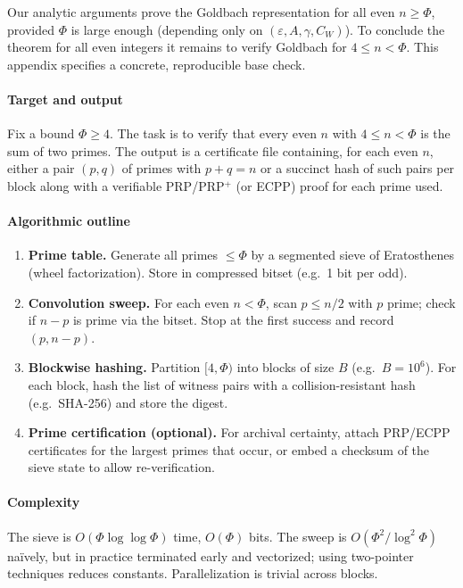 Our analytic arguments prove the Goldbach representation for all even $n\ge \Phi$, provided $\Phi$ is large enough (depending only on $(\varepsilon,A,\gamma,C_W)$). To conclude the theorem for all even integers it remains to verify Goldbach for $4\le n<\Phi$. This appendix specifies a concrete, reproducible base check.

\paragraph{Target and output}
Fix a bound $\Phi\ge 4$. The task is to verify that every even $n$ with $4\le n<\Phi$ is the sum of two primes. The output is a certificate file containing, for each even $n$, either a pair $(p,q)$ of primes with $p+q=n$ or a succinct hash of such pairs per block along with a verifiable PRP/PRP\(^+\) (or ECPP) proof for each prime used.

\paragraph{Algorithmic outline}

\begin{enumerate}
\item \textbf{Prime table.} Generate all primes $\le \Phi$ by a segmented sieve of Eratosthenes (wheel factorization). Store in compressed bitset (e.g.\ 1 bit per odd).
\item \textbf{Convolution sweep.} For each even $n<\Phi$, scan $p\le n/2$ with $p$ prime; check if $n-p$ is prime via the bitset. Stop at the first success and record $(p,n-p)$.
\item \textbf{Blockwise hashing.} Partition $[4,\Phi)$ into blocks of size $B$ (e.g.\ $B=10^6$). For each block, hash the list of witness pairs with a collision-resistant hash (e.g.\ SHA-256) and store the digest.
\item \textbf{Prime certification (optional).} For archival certainty, attach PRP/ECPP certificates for the largest primes that occur, or embed a checksum of the sieve state to allow re-verification.
\end{enumerate}

\paragraph{Complexity}
The sieve is $O(\Phi\log\log\Phi)$ time, $O(\Phi)$ bits. The sweep is $O(\Phi^2/\log^2\Phi)$ naïvely, but in practice terminated early and vectorized; using two-pointer techniques reduces constants. Parallelization is trivial across blocks.

